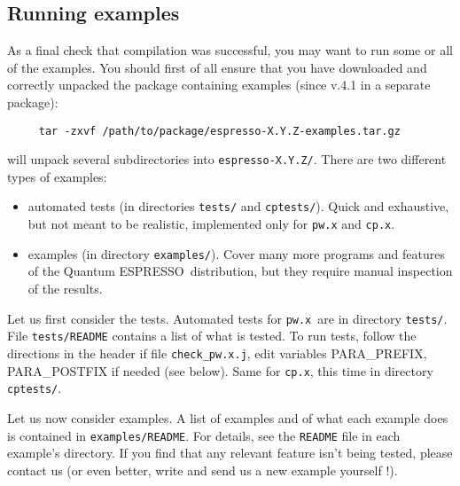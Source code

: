 \documentclass[12pt,a4paper]{article}
\def\qe{{\sc Quantum ESPRESSO}}
\def\pw.x{\texttt{pw.x}}
\def\cp.x{\texttt{cp.x}}
\begin{document}
\subsection{Running examples}
\label{SubSec:Examples}
As a final check that compilation was successful, you may want to run some or
all of the examples. You should first of all ensure that you have downloaded 
and correctly unpacked the package containing examples (since v.4.1 in a
separate package):
\begin{verbatim}
     tar -zxvf /path/to/package/espresso-X.Y.Z-examples.tar.gz
\end{verbatim}
will unpack several subdirectories into \texttt{espresso-X.Y.Z/}.
There are two different types of examples: 
\begin{itemize}
\item automated tests (in directories \texttt{tests/} 
and \texttt{cptests/}). Quick and exhaustive, but not
meant to be realistic, implemented only for \pw.x and \cp.x.
\item examples (in directory \texttt{examples/}).
Cover many more programs and features of the \qe\ distribution,
but they require manual inspection of the results. 
\end{itemize}

Let us first consider the tests. Automated tests for \pw.x\ are in directory 
\texttt{tests/}. File \texttt{tests/README} contains a list of what is tested.
To run tests, follow the directions in the header if file 
\texttt{check\_pw.x.j}, edit variables PARA\_PREFIX, PARA\_POSTFIX 
if needed (see below). Same for \cp.x, this time in directory 
\texttt{cptests/}.

Let us now consider examples. A list of examples and of what each example
does is contained in \texttt{examples/README}. 
For details, see the \texttt{README} file in each example's directory. 
If you find that any relevant feature isn't being tested, please contact us 
(or even better, write and send us a new example yourself !).
\end{document}
